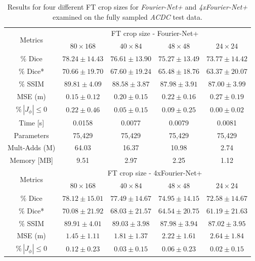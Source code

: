 \documentclass[english,version-2022-01]{uzl-thesis} %
\begin{document}
\begin{table}[h] %
	\centering
	\caption{Results for four different FT crop sizes for \emph{Fourier-Net+} and \emph{4xFourier-Net+} examined on the fully sampled \emph{ACDC} test data.}
	\label{tab:FTCropSize}
	\begin{tabular}{c c c c c} %
		\toprule
		\multirow{2}{*}{Metrics} & \multicolumn{4}{c}{FT crop size - Fourier-Net+} \\
		\cline{2-5}
		 & $80 \times 168$ & $40 \times 84$ & $48 \times 48$ & $24 \times 24$ \\		
		\midrule
		$\%$ Dice & $78.24 \pm 14.43$ & $76.61 \pm 13.90$ & $75.27 \pm 13.49$ & $73.77 \pm 14.42$ \\
		$\%$ Dice* & $70.66 \pm 19.70$ & $67.60 \pm 19.24$ & $65.48 \pm 18.76$ & $63.37 \pm 20.07$ \\
		$\%$ SSIM & $89.81 \pm 4.09$ & $88.58 \pm 3.87$ & $87.98 \pm 3.91$ & $87.00 \pm 3.99$ \\
		MSE (m) & $0.15 \pm 0.12$ & $0.20 \pm 0.15$ & $0.22 \pm 0.16$ & $0.27 \pm 0.19$ \\
		$\% \, |J_{\phi}|\leq0$ & $0.22 \pm 0.46$ & $0.05 \pm 0.15$ & $0.09 \pm 0.25$ & $0.00 \pm 0.02$ \\		
		Time [s] 	  & 0.0158 & 0.0077 & 0.0079 & 0.0081 \\
		Parameters 	  & 75,429 & 75,429 & 75,429 & 75,429 \\
		Mult-Adds (M) & 64.03  & 16.37  & 10.98  & 2.74 \\
		Memory [MB] 	  & 9.51   & 2.97   & 2.25   & 1.12 \\
		\midrule
		\multirow{2}{*}{Metrics} & \multicolumn{4}{c}{FT crop size - 4xFourier-Net+} \\
		\cline{2-5}
		 & $80 \times 168$ & $40 \times 84$ & $48 \times 48$ & $24 \times 24$ \\		
		\midrule
		$\%$ Dice & $78.12 \pm 15.01$ & $77.49 \pm 14.67$ & $74.95 \pm 14.15$ & $72.58 \pm 14.67$ \\
		$\%$ Dice* & $70.08 \pm 21.92$ & $68.03 \pm 21.57$ & $64.54 \pm 20.75$ & $61.19 \pm 21.63$ \\
		$\%$ SSIM & $89.91 \pm 4.01$ & $89.03 \pm 3.98$ & $87.98 \pm 3.94$ & $87.02 \pm 3.95$ \\
		MSE (m) & $1.45 \pm 1.11$ & $1.81 \pm 1.37$ & $2.22 \pm 1.61$ & $2.64 \pm 1.84$ \\
		$\% \, |J_{\phi}|\leq0$ & $0.12 \pm 0.23$ & $0.03 \pm 0.15$ & $0.06 \pm 0.23$ & $0.02 \pm 0.15$ \\	

\end{tabular}
\end{table}
\end{document}
